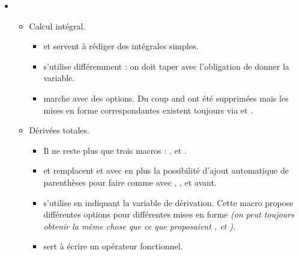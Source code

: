 \documentclass[12pt,a4paper]{book}
\begin{document}
\begin{description}
\begin{itemize}[itemsep=.5em]
    
    
    
        \separation
        \item {}
        \begin{itemize}[itemsep=.5em]
            \item Calcul intégral.
            
            \begin{itemize}[itemsep=.5em, label=$\rightarrow$]
                \item {} et  servent à rédiger des intégrales simples.
    
                \item {} s'utilise différemment : on doit taper  avec l'obligation de donner la variable.
                
                \item {} marche avec des options.
                      Du coup  and  ont été supprimées mais les mises en forme correspondantes existent toujours via  et .
    	    \end{itemize}
    	    
            
            \item Dérivées totales.
            
            \begin{itemize}[itemsep=.5em, label=$\rightarrow$]
                \item Il ne reste plus que trois macros : ,  et .
    
                \item {} et  remplacent  et  avec en plus la possibilité d'ajout automatique de parenthèses pour faire comme avec , ,  et  avant.
    
    
                \item {} s'utilise en indiquant la variable de dérivation. Cette macro propose différentes options pour différentes mises en forme 
                      \emph{(on peut toujours obtenir la même chose que ce que proposaient ,  et )}.
    
                \item {} sert à écrire un opérateur fonctionnel.
    	    \end{itemize}
    

\end{itemize}
\end{itemize}
\end{description}
\end{document}
